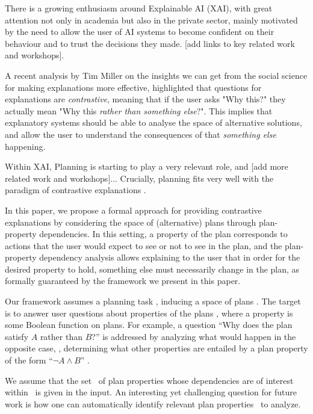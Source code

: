 There is a growing enthusiasm around Explainable AI (XAI), with great attention not only in academia but also in the private sector, mainly motivated by the need to allow the user of AI systems to become confident on their behaviour and to trust the decisions they made. [add links to key related work and workshops].

A recent analysis by Tim Miller on the insights we can get from the social science for making explanations more effective, highlighted that questions for explanations are \textit{contrastive}, meaning that if the user asks "Why this?" they actually mean "Why this \textit{rather than something else}?".
 This implies that explanatory systems should be able to analyse the space of alternative solutions, and allow the user to understand the consequences of that \textit{something else} happening.

Within XAI, Planning is starting to play a very relevant role, and [add more related work and workshops]...
Crucially, planning fits very well with the paradigm of contrastive explanations \cite{xaip_magazzeni, contrastive_miller}.

In this paper, we propose a formal approach for providing contrastive explanations by considering the space of (alternative) plans through plan-property dependencies. In this setting, a property of the plan corresponds to actions that the user would expect to see or not to see in the plan, and the plan-property dependency analysis allows explaining to the user that in order for the desired property to hold, something else must necessarily change in the plan, as formally guaranteed by the framework we present in this paper.

Our framework assumes a planning task \task, inducing a space of plans
\plans. The target is to answer user questions about properties of the
plans \plans, where a property is some Boolean function on plans. For
example, a question ``Why does the plan satisfy $A$ rather than $B$?''
is addressed by analyzing what would happen in the opposite case, \ie,
determining what other properties are entailed by a plan property of
the form ``$\neg A \wedge B$'' . 

%



We assume that the set \props\ of plan properties whose dependencies
are of interest within \plans\ is given in the input. An interesting
yet challenging question for future work is how one can automatically
identify relevant plan properties \props\ to analyze.

